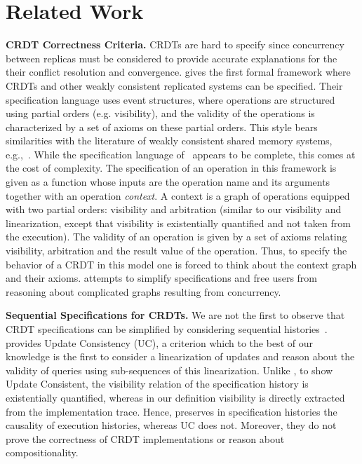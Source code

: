 \section{Related Work}
\label{sec:rel-work}

\noindent
{\bf CRDT Correctness Criteria.}
CRDTs are hard to specify since concurrency between
replicas must be considered to provide accurate explanations for the
their conflict resolution and convergence.
%
\citet{BurckhardtGYZ14, Burckhardt14} gives the first formal framework
where CRDTs and other weakly consistent replicated systems can be
specified.
%
Their specification language uses event structures, where operations
are structured using partial orders (e.g. visibility), and
the validity of the operations is characterized by a set of
axioms on these partial orders.
%
This style bears similarities with the literature of weakly consistent
shared memory systems, e.g.,~\cite{AlglaveMT14}.
%
While the specification language
of~\cite{BurckhardtGYZ14,Burckhardt14} appears to be complete, this
comes at the cost of complexity.
%
The specification of an operation in this framework is given as a
function whose inputs are the operation name and its arguments
together with an operation \emph{context}.
%
A context is a graph of operations equipped with two partial orders:
visibility and arbitration (similar to our visibility and linearization,
except that visibility is existentially quantified and not taken from
the execution).
%
%
The validity of an operation is given by a set of axioms relating
visibility, arbitration and the result value of the operation.
%
Thus, to specify the behavior of a CRDT in this model one is
forced to think about the context graph and their axioms.
%
\CRDTLinshort{} attempts to simplify specifications and
free users from reasoning about complicated graphs resulting from
concurrency.

\smallskip
\noindent
{\bf Sequential Specifications for CRDTs.}
We are not the first to observe that CRDT specifications can be
simplified by considering sequential histories~\cite{PerrinMJ14,
  JagadeesanR18}.
%
\citet{PerrinMJ14} provides Update Consistency (UC), a criterion which to
the best of our knowledge is the first to consider a linearization of
updates and reason about the validity of queries using sub-sequences
of this linearization.
%
Unlike \CRDTLinshort{}, to show Update Consistent, the visibility
relation of the specification history is existentially quantified,
whereas in our definition visibility is directly extracted from the
implementation trace.
%
Hence, \CRDTLinshort{} preserves in specification histories the
causality of execution histories, whereas UC does not.
%
Moreover, they do not prove the correctness of CRDT implementations or
reason about compositionality.

